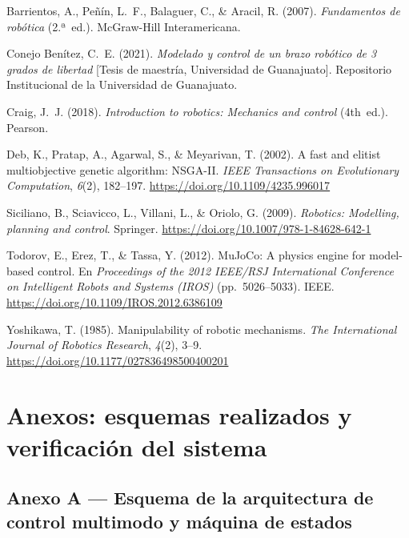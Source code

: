 \documentclass[11pt,a4paper]{article}
\begin{document}
Barrientos, A., Peñín, L.~F., Balaguer, C., \& Aracil, R. (2007). \emph{Fundamentos de robótica} (2.ª~ed.). McGraw-Hill Interamericana.

Conejo Benítez, C.~E. (2021). \emph{Modelado y control de un brazo robótico de 3 grados de libertad} [Tesis de maestría, Universidad de Guanajuato]. Repositorio Institucional de la Universidad de Guanajuato.

Craig, J.~J. (2018). \emph{Introduction to robotics: Mechanics and control} (4th~ed.). Pearson.

Deb, K., Pratap, A., Agarwal, S., \& Meyarivan, T. (2002). A fast and elitist multiobjective genetic algorithm: NSGA-II. \emph{IEEE Transactions on Evolutionary Computation}, \emph{6}(2), 182--197. \url{https://doi.org/10.1109/4235.996017}

Siciliano, B., Sciavicco, L., Villani, L., \& Oriolo, G. (2009). \emph{Robotics: Modelling, planning and control}. Springer. \url{https://doi.org/10.1007/978-1-84628-642-1}

Todorov, E., Erez, T., \& Tassa, Y. (2012). MuJoCo: A physics engine for model-based control. En \emph{Proceedings of the 2012 IEEE/RSJ International Conference on Intelligent Robots and Systems (IROS)} (pp.~5026--5033). IEEE. \url{https://doi.org/10.1109/IROS.2012.6386109}

Yoshikawa, T. (1985). Manipulability of robotic mechanisms. \emph{The International Journal of Robotics Research}, \emph{4}(2), 3--9. \url{https://doi.org/10.1177/027836498500400201}

\endgroup

\clearpage
\section{Anexos: esquemas realizados y verificación del sistema}

\subsection{Anexo A --- Esquema de la arquitectura de control multimodo y máquina de estados}
\end{document}
